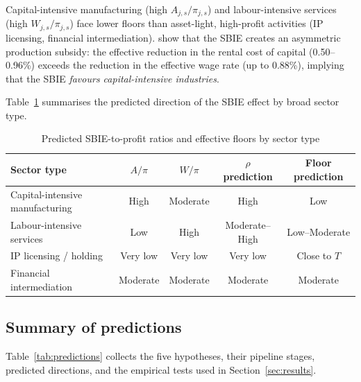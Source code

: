 \documentclass[11pt,a4paper]{article}
\begin{document}
Capital-intensive manufacturing (high $A_{j,s}/\pi_{j,s}$) and labour-intensive services (high $W_{j,s}/\pi_{j,s}$) face lower floors than asset-light, high-profit activities (IP licensing, financial intermediation). \citet{schjelderup2024} show that the SBIE creates an asymmetric production subsidy: the effective reduction in the rental cost of capital (0.50--0.96\%) exceeds the reduction in the effective wage rate (up to 0.88\%), implying that the SBIE \emph{favours capital-intensive industries}.

Table~\ref{tab:sector_predictions} summarises the predicted direction of the SBIE effect by broad sector type. 
\begin{table}[H]
\centering
\caption{Predicted SBIE-to-profit ratios and effective floors by sector type}
\label{tab:sector_predictions}
\small
\begin{tabular}{@{}lcccc@{}}
\toprule
Sector type & $A/\pi$ & $W/\pi$ & $\rho$ prediction & Floor prediction \\
\midrule
Capital-intensive manufacturing & High & Moderate & High & Low \\
Labour-intensive services & Low & High & Moderate--High & Low--Moderate \\
IP licensing / holding & Very low & Very low & Very low & Close to $T$ \\
Financial intermediation & Moderate & Moderate & Moderate & Moderate \\
\bottomrule
\end{tabular}
\end{table}




\subsection{Summary of predictions}\label{sec:predictions}

Table~\ref{tab:predictions} collects the five hypotheses, their pipeline stages, predicted directions, and the empirical tests used in Section~\ref{sec:results}.
\end{document}
